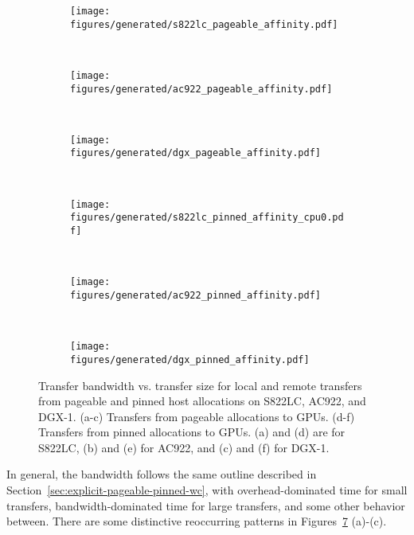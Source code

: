 \begin{figure}[ht]
	\centering
	\begin{subfigure}[b]{0.31\textwidth}
		\texttt{[image: figures/generated/s822lc\_pageable\_affinity.pdf]}
		\caption{}
		\label{fig:minsky_pageable_affinity}
	\end{subfigure}
	~
	\begin{subfigure}[b]{0.31\textwidth}
		\texttt{[image: figures/generated/ac922\_pageable\_affinity.pdf]}
		\caption{}
		\label{fig:hal_pageable_affinity}
	\end{subfigure}
	~
	\begin{subfigure}[b]{0.31\textwidth}
		\texttt{[image: figures/generated/dgx\_pageable\_affinity.pdf]}
		\caption{}
		\label{fig:dgx_pageable_affinity}
	\end{subfigure}
	\\
	\begin{subfigure}[b]{0.31\textwidth}
		\texttt{[image: figures/generated/s822lc\_pinned\_affinity\_cpu0.pdf]}
		\caption{}
		\label{fig:minsky_pinned_affinity}
	\end{subfigure}
	~
	\begin{subfigure}[b]{0.31\textwidth}
		\texttt{[image: figures/generated/ac922\_pinned\_affinity.pdf]}
		\caption{}
		\label{fig:hal_pinned_affinity}
	\end{subfigure}
	~
	\begin{subfigure}[b]{0.31\textwidth}
		\texttt{[image: figures/generated/dgx\_pinned\_affinity.pdf]}
		\caption{}
		\label{fig:dgx_pinned_affinity}
		
	\end{subfigure}
	\caption[CPU-GPU affinity and \texttt{cudaMemcpy} bandwidth]{
		Transfer bandwidth vs. transfer size for local and remote transfers from pageable and pinned host allocations on S822LC, AC922, and DGX-1.
		(a-c) Transfers from pageable allocations to GPUs.
		(d-f) Transfers from pinned allocations to GPUs.
		(a) and (d) are for S822LC, (b) and (e) for AC922, and (c) and (f) for DGX-1.
	}
	\label{fig:cpu-gpu-affinity-direction}
\end{figure}

In general, the bandwidth follows the same outline described in Section~\ref{sec:explicit-pageable-pinned-wc}, with overhead-dominated time for small transfers, bandwidth-dominated time for large transfers, and some other behavior between.
There are some distinctive reoccurring patterns in Figures~\ref{fig:cpu-gpu-affinity-direction} (a)-(c).

